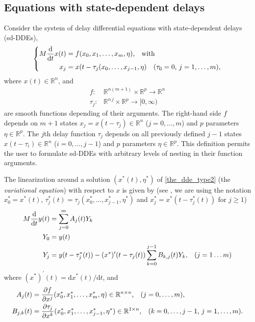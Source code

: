 \documentclass[10pt]{scrartcl}
\newcommand{\define}[1]{\emph{#1}}
\renewcommand{\d}{\mathrm{d}}
\newcommand{\RR}{\mathbb{R}}
\begin{document}
\subsection{Equations with state-dependent delays}\label{sd_dde}

Consider the system of delay differential equations with
state-dependent delays (sd-DDEs),
\begin{equation}\label{the_dde_type2}
\left\{
\begin{aligned}
M\frac{\d}{\d t}{x(t)}&=f(x_0,x_1,\ldots,x_m,\eta)\mbox{,\quad with}\\
x_j&=x(t-\tau_j(x_0,\ldots,x_{j-1},\eta)\quad\mbox{($\tau_0=0$, $j=1,\ldots,m$)}\mbox{,}
\end{aligned}
\right.
\end{equation}
where $x(t)\in\RR^n$, and
\begin{align*}
 f:&\RR^{n(m+1)}\times\RR^p \to\RR^n\\
 \tau_j:&\RR^{n\,j}\times\RR^p\to[0,\infty)
\end{align*}
are smooth functions depending of their arguments. The right-hand side
$f$ depends on $m+1$ states $x_j=x(t-\tau_j)\in\RR^n$ ($j=0,\ldots,m$)
and $p$ parameters $\eta\in\RR^p$. The $j$th delay function $\tau_j$
depends on all previously defined $j-1$ states $x(t-\tau_i)\in\RR^n$
($i=0,\ldots,j-1$) and $p$ parameters $\eta\in\RR^p$. This
definition permits the user to formulate sd-DDEs with arbitrary levels
of nesting in their function arguments.

The linearization around a solution $(x^*(t),\eta^*)$ of
\eqref{the_dde_type2} (the \define{variational equation}) with respect
to $x$ is given by (see \cite{HKWW06}, we are using the notation
$x^*_0=x^*(t)$, $\tau_j^*(t)=\tau_j(x^*_0,\ldots,x^*_{j-1},\eta^*)$ and
$x^*_j=x^*(t-\tau^*_j(t))$ for $j\geq1$)
\begin{equation}\label{the_var_equa2}
\begin{aligned}
M\frac{\d}{\d t}{y(t)}&=\sum_{j=0}^mA_j(t)Y_k \\
Y_0&=y(t)\\
Y_j&=y(t-\tau^*_j(t))-(x^*)'(t-\tau_j(t))\sum_{k=0}^{j-1}B_{k,j}(t)Y_k\mbox{,\quad($j=1\ldots m$)}
\end{aligned}
\end{equation}
where $(x^*)^{'}(t)={\d}x^*(t)/{\d}t$, and
\begin{equation}\label{A_def2}
\begin{aligned}
  A_j(t)&=\frac{\partial f}{\partial x^j}(x^*_0,x^*_1,\ldots,x^*_m,\eta)\in\RR^{n\times n}
  \mbox{,\quad ($j=0,\ldots,m$),}\\
  B_{j,k}(t)&=\frac{\partial \tau_j}{\partial x^k}(x^*_0,x^*_1,\ldots,x^*_{j-1},\eta^*)\in\RR^{1\times n}\mbox{,\quad ($k=0,\ldots,j-1$, $j=1,\ldots,m$).} 
\end{aligned}
\end{equation}
\end{document}
